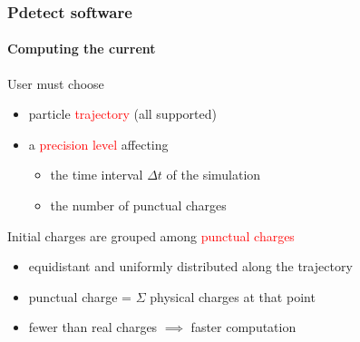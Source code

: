 \documentclass[14pt]{beamer}
\begin{document}
\begin{frame}
\begin{columns}
\begin{column}{0.47\textwidth}
      \end{column}
    \end{columns}
\end{frame}

\begin{frame}
  \frametitle{Pdetect software}
  \framesubtitle{Computing the current}


\fontsize{13pt}{7.2}\selectfont


User must choose

\begin{itemize}
  \item particle \textcolor{red}{trajectory} (all supported)
  \item a \textcolor{red}{precision level} affecting
  \begin{itemize}
    \item the time interval $\Delta t$ of the simulation
    \item the number of punctual charges
  \end{itemize}
\end{itemize}

\vspace{1.5em}

Initial charges are grouped among \textcolor{red}{punctual charges}

\begin{itemize}
  \item equidistant and uniformly distributed along the trajectory
  \item punctual charge = $\Sigma$ physical charges at that point
  \item fewer than real charges $\implies$ faster computation
\end{itemize}

\end{frame}
\end{document}
